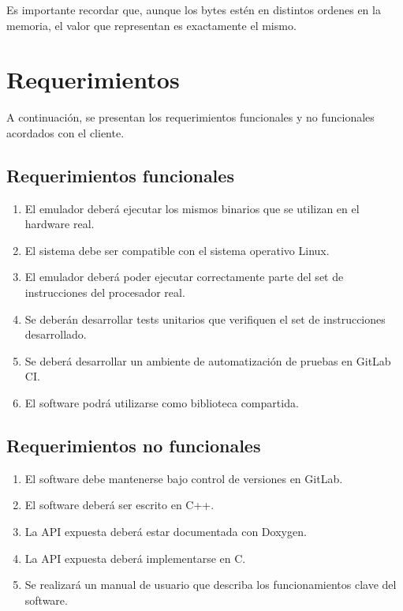 Es importante recordar que, aunque los bytes estén en distintos ordenes en la memoria, el valor que representan es exactamente el mismo.


\section{Requerimientos}
\label{sec:requerimientos}

A continuación, se presentan los requerimientos funcionales y no funcionales acordados con el cliente.

\subsection{Requerimientos funcionales}
\label{subsec:requerimientos_funcionales}

\begin{enumerate}
\item El emulador deberá ejecutar los mismos binarios que se utilizan en el hardware real.
\item El sistema debe ser compatible con el sistema operativo Linux.
\item El emulador deberá poder ejecutar correctamente parte del set de instrucciones del procesador real.
\item Se deberán desarrollar tests unitarios que verifiquen el set de instrucciones desarrollado.
\item Se deberá desarrollar un ambiente de automatización de pruebas en GitLab CI.
\item El software podrá utilizarse como biblioteca compartida.
\end{enumerate}

\subsection{Requerimientos no funcionales}
\label{subsec:requerimientos_no_funcionales}

\begin{enumerate}
\item El software debe mantenerse bajo control de versiones en GitLab.
\item El software deberá ser escrito en C++.
\item La API expuesta deberá estar documentada con Doxygen.
\item La API expuesta deberá implementarse en C.
\item Se realizará un manual de usuario que describa los funcionamientos clave del software.
\end{enumerate}

